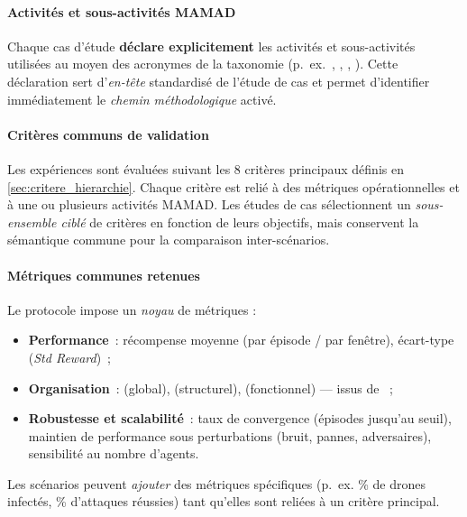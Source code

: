 \paragraph{Activités et sous-activités MAMAD}
Chaque cas d’étude \textbf{déclare explicitement} les activités et sous-activités utilisées au moyen des acronymes de la taxonomie (p.~ex.~, , , ). Cette déclaration sert d’\textit{en-tête} standardisé de l’étude de cas et permet d’identifier immédiatement le \textit{chemin méthodologique} activé.

\paragraph{Critères communs de validation}
Les expériences sont évaluées suivant les 8 critères principaux définis en \autoref{sec:critere_hierarchie}. Chaque critère est relié à des métriques opérationnelles et à une ou plusieurs activités MAMAD. Les études de cas sélectionnent un \textit{sous-ensemble ciblé} de critères en fonction de leurs objectifs, mais conservent la sémantique commune pour la comparaison inter-scénarios.

\paragraph{Métriques communes retenues}
Le protocole impose un \textit{noyau} de métriques :
\begin{itemize}
  \item \textbf{Performance}~: récompense moyenne (par épisode / par fenêtre), écart-type (\emph{Std Reward})~;
  \item \textbf{Organisation}~:  (global),  (structurel),  (fonctionnel) — issus de ~;
  \item \textbf{Robustesse et scalabilité}~: taux de convergence (épisodes jusqu’au seuil), maintien de performance sous perturbations (bruit, pannes, adversaires), sensibilité au nombre d’agents.
\end{itemize}
Les scénarios peuvent \textit{ajouter} des métriques spécifiques (p.~ex. \% de drones infectés, \% d’attaques réussies) tant qu’elles sont reliées à un critère principal.

